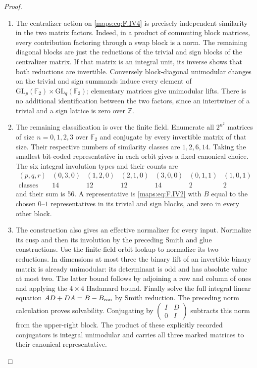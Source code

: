 \begin{proof}
\begin{enumerate}[label={$\langle1\rangle$\arabic*.}]
\item The centralizer action on \eqref{maps:eq:F.IV4} is precisely independent
similarity in the two matrix factors.  Indeed, in a product
of commuting block matrices, every contribution factoring
through a swap block is a norm.  The remaining diagonal
blocks are just the reductions of the trivial and sign
blocks of the centralizer matrix.  If that matrix is an
integral unit, its inverse shows that both reductions are
invertible.  Conversely block-diagonal unimodular changes
on the trivial and sign summands induce every element of
$\mathrm{GL}_p(\mathbb F_2)\times
\mathrm{GL}_q(\mathbb F_2)$; elementary matrices give
unimodular lifts.  There is no additional identification
between the two factors, since an intertwiner of a trivial
and a sign lattice is zero over $\mathbb Z$.

\item The remaining classification is over the finite field.  Enumerate
all $2^{n^2}$ matrices of size $n=0,1,2,3$ over $\mathbb F_2$
and conjugate by every invertible matrix of that size.
Their respective numbers of similarity classes are
$1,2,6,14$.  Taking the smallest bit-coded representative
in each orbit gives a fixed canonical choice.
The six integral involution types and their counts are
\[
\begin{array}{c|rrrrrr}
 (p,q,r)&(0,3,0)&(1,2,0)&(2,1,0)&(3,0,0)&(0,1,1)&(1,0,1)\\\hline
 \text{classes}&14&12&12&14&2&2
\end{array}
\]
and their sum is 56.  A representative is \eqref{maps:eq:F.IV2} with
$B$ equal to the chosen $0$--$1$ representatives in its
trivial and sign blocks, and zero in every other block.

\item The construction also gives an effective normalizer for every input.  Normalize its
cusp and then its involution by the preceding Smith and
glue constructions.  Use the finite-field orbit lookup to
normalize its two reductions.  In dimensions at most three
the binary lift of an invertible binary matrix is already
unimodular: its determinant is odd and has absolute value
at most two.  The latter bound follows by adjoining a row
and column of ones and applying the $4\times4$ Hadamard
bound.  Finally solve the full integral linear equation
$AD+DA=B-B_{\rm can}$ by Smith reduction.  The preceding
norm calculation proves solvability.  Conjugating by
$\begin{pmatrix}I&D\\0&I\end{pmatrix}$ subtracts this norm
from the upper-right block.  The product of these explicitly
recorded conjugators is integral unimodular and carries all
three marked matrices to their canonical representative.


\end{enumerate}
\end{proof}
